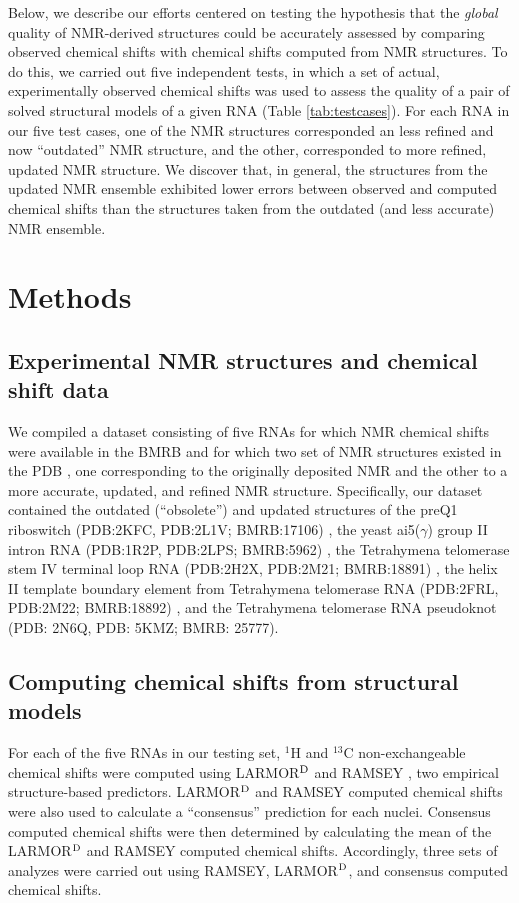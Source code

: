 \documentclass[fleqn,10pt]{wlscirep}
\begin{document}
Below, we describe our efforts centered on testing the hypothesis that the \textit{global} quality of NMR-derived structures could be accurately assessed by comparing observed chemical shifts with chemical shifts computed from NMR structures. To do this, we carried out five independent tests, in which a set of actual, experimentally observed chemical shifts  was used to assess the quality of a pair of solved structural models of a given RNA (Table \ref{tab:testcases}). For each RNA in our five test cases, one of the NMR structures corresponded an less refined and now ``outdated'' NMR structure, and the other,  corresponded to more refined, updated NMR structure. We discover that, in general, the structures from the updated NMR ensemble exhibited lower errors between observed and computed chemical shifts than the structures taken from the outdated (and less accurate) NMR ensemble.

\section*{Methods}
\subsection*{Experimental NMR structures and chemical shift data}
We compiled a dataset consisting of five RNAs for which NMR chemical shifts were available in the BMRB \cite{ulrich2008biomagresbank} and for which two set of NMR structures existed in the PDB \cite{bernstein1978protein}, one corresponding to the originally deposited NMR and the other to a more accurate, updated, and refined NMR structure. Specifically, our dataset contained the outdated (``obsolete'') and updated structures of the preQ1 riboswitch (PDB:2KFC, PDB:2L1V; BMRB:17106) \cite{zhang2011comparison,kang2009structural}, the yeast ai5($\gamma$) group II intron RNA (PDB:1R2P, PDB:2LPS; BMRB:5962) \cite{henriksen2012molecular,sigel2004solution}, the Tetrahymena telomerase stem IV terminal loop RNA (PDB:2H2X, PDB:2M21; BMRB:18891) \cite{richards2006structural}, the helix II template boundary element from Tetrahymena telomerase RNA (PDB:2FRL, PDB:2M22; BMRB:18892) \cite{richards2006structure}, and the Tetrahymena telomerase RNA pseudoknot (PDB: 2N6Q, PDB: 5KMZ; BMRB: 25777)\cite{jiang2015structure}.

\subsection*{Computing chemical shifts from structural models}
For each of the five RNAs in our testing set, $^{1}$H and $^{13}$C non-exchangeable chemical shifts were computed using LARMOR$^{\rm D}$ \cite{frank2014simple} and RAMSEY \cite{frank2013prediction}, two empirical structure-based predictors.  LARMOR$^{\rm D}$ and RAMSEY computed chemical shifts were also used to calculate a ``consensus'' prediction for each nuclei. Consensus computed chemical shifts were then determined by calculating the mean of the LARMOR$^{\rm D}$ and RAMSEY computed chemical shifts. Accordingly, three sets of analyzes were carried out using RAMSEY, LARMOR$^{\rm D}$, and consensus computed chemical shifts. 
\end{document}
